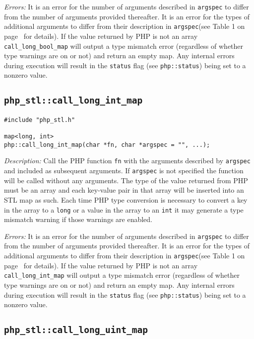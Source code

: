 \documentclass[11pt,titlepage]{article}
\begin{document}
\emph{Errors:} It is an error for the number of arguments described in \verb|argspec| to differ from the number of arguments provided thereafter. It is an error for the types of additional arguments to differ from their description in \verb|argspec|(see Table 1 on page~\pageref{Table1} for details). If the value returned by PHP is not an array \verb|call_long_bool_map| will output a type mismatch error (regardless of whether type warnings are on or not) and return an empty map. Any internal errors during execution will result in the \verb|status| flag (see \verb|php::status|) being set to a nonzero value.


\subsection{\texttt{php\_stl::call\_long\_int\_map}}

\begin{verbatim}
#include "php_stl.h"

map<long, int> 
php::call_long_int_map(char *fn, char *argspec = "", ...);
\end{verbatim}

\emph{Description:} Call the PHP function \verb|fn| with the arguments described by \verb|argspec| and included as subsequent arguments. If \verb|argspec| is not specified the function will be called without any arguments. The type of the value returned from PHP must be an array and each key-value pair in that array will be inserted into an STL map as such. Each time PHP type conversion is necessary to convert a key in the array to a \verb|long| or a value in the array to an \verb|int| it may generate a type mismatch warning if those warnings are enabled.

\emph{Errors:} It is an error for the number of arguments described in \verb|argspec| to differ from the number of arguments provided thereafter. It is an error for the types of additional arguments to differ from their description in \verb|argspec|(see Table 1 on page~\pageref{Table1} for details). If the value returned by PHP is not an array \verb|call_long_int_map| will output a type mismatch error (regardless of whether type warnings are on or not) and return an empty map. Any internal errors during execution will result in the \verb|status| flag (see \verb|php::status|) being set to a nonzero value.


\subsection{\texttt{php\_stl::call\_long\_uint\_map}}
\end{document}

